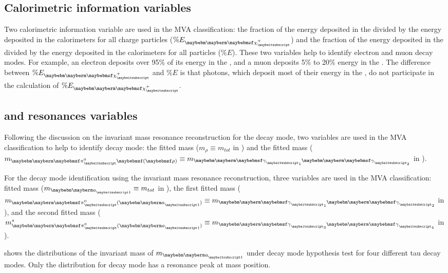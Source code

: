 \subsection{Calorimetric information variables}


Two calorimetric information variable are used in the MVA classification: the fraction of the energy  deposited in the \ECAL divided by the  energy deposited in the calorimeters for all charge particles ($\% E_{\charge}$) and the fraction of the energy  deposited in the \ECAL divided by the  energy deposited in the calorimeters for all particles ($\% E$). These  two variables help to identify electron and muon decay modes. For example, an electron deposits over 95\% of its energy in the \ECAL, and a muon deposits 5\% to 20\% energy in the \ECAL. The difference between $\% E_{\charge}$ and  $\% E$ is that photons, which deposit most of their energy in the \ECAL, do not participate in the calculation of $\% E_{\charge}$.

\subsection{\texorpdfstring{\decayRhoShort and \decayAiPhotonShort} \, resonances variables}

Following the discussion on the \Prho invariant mass resonance reconstruction for the \decayRhoShort  decay mode,  two variables are used in the MVA classification to help to identify  \decayRhoShort  decay mode: the fitted \Prho mass ($m_\rho \equiv m_{tot}$ in ) and the fitted \Ppizero mass ($m_{\Pgpz\parenths{\rho}} \equiv m_{\Pphoton_1\Pphoton_2}$ in  ).

For the \decayAiPhotonShort decay mode identification using the \Pai invariant mass resonance reconstruction, three variables are used in the MVA classification:  fitted \Pai mass ($m_{\Pai} \equiv m_{tot}$ in ), the first fitted \Ppizero mass ($m_{\Pgpz(\Pai)} \equiv m_{\Pphoton_1\Pphoton_2}$ in ), and the second fitted \Ppizero mass ($m^*_{\Pgpz(\Pai)} \equiv  m_{\Pphoton_3\Pphoton_4}$ in ).

  shows the distributions of the invariant mass of $m_{\Pai}$ under \decayAiPhotonShort decay mode hypothesis test for four different tau decay modes. Only the distribution for \decayAiPhotonShort decay mode has a resonance peak at \Pai mass position.


